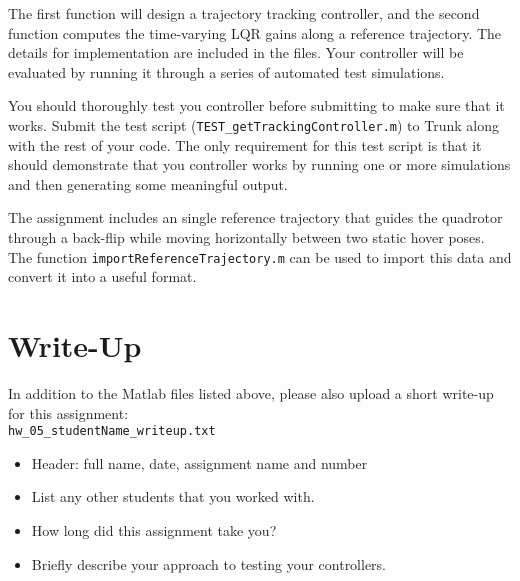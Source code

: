 \par
The first function will design a trajectory tracking controller,
and the second function computes the time-varying LQR gains along a reference trajectory.
The details for implementation are included in the files.
Your controller will be evaluated by running it through a series of automated
test simulations.

\par
You should thoroughly test you controller before submitting to make sure that it works.
Submit the test script (\texttt{TEST\_getTrackingController.m}) to Trunk along with the rest of your code.
The only requirement for this test script is that it
should demonstrate that you controller works by running one or more simulations
and then generating some meaningful output.

\par
The assignment includes an single reference trajectory that guides the quadrotor
through a back-flip while moving horizontally between two static hover poses.
The function \texttt{importReferenceTrajectory.m} can be used to import this data and convert
it into a useful format.

\section*{Write-Up}

In addition to the Matlab files listed above, please also upload a short write-up
for this assignment: \\
\texttt{hw\_05\_studentName\_writeup.txt}
\vspace{-0.0em} \begin{itemize}  \setlength\itemsep{0em} \setlength\itemindent{18pt}
  \item Header: full name, date, assignment name and number
  \item List any other students that you worked with.
  \item How long did this assignment take you?
  \item Briefly describe your approach to testing your controllers.
\end{itemize}



